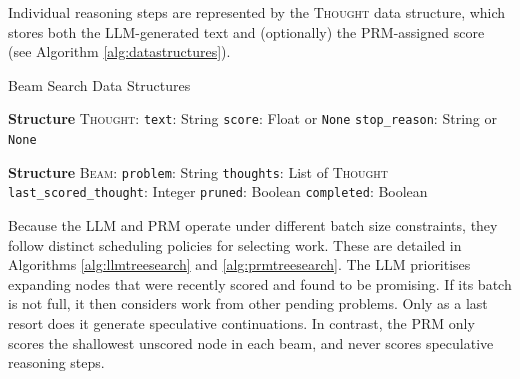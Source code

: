 \documentclass[11pt,twoside]{report}
\begin{document}
Individual reasoning steps are represented by the \textsc{Thought} data structure, which stores both the LLM-generated text and (optionally) the PRM-assigned score (see Algorithm \ref{alg:datastructures}).

\begin{algorithm}[H]\label{alg:datastructures}
\caption{Beam Search Data Structures}
\begin{algorithmic}[1]
\State \textbf{Structure} \textsc{Thought}:
\State \hspace{0.5cm} \texttt{text}: String 
\State \hspace{0.5cm} \texttt{score}: Float or \texttt{None} 
\State \hspace{0.5cm} \texttt{stop\_reason}: String or \texttt{None} 

\Statex

\State \textbf{Structure} \textsc{Beam}:
\State \hspace{0.5cm} \texttt{problem}: String 
\State \hspace{0.5cm} \texttt{thoughts}: List of \textsc{Thought} 
\State \hspace{0.5cm} \texttt{last\_scored\_thought}: Integer 
\State \hspace{0.5cm} \texttt{pruned}: Boolean 
\State \hspace{0.5cm} \texttt{completed}: Boolean 
\end{algorithmic}
\end{algorithm}

Because the LLM and PRM operate under different batch size constraints, they follow distinct scheduling policies for selecting work. 
These are detailed in Algorithms \ref{alg:llmtreesearch} and \ref{alg:prmtreesearch}. 
The LLM prioritises expanding nodes that were recently scored and found to be promising. 
If its batch is not full, it then considers work from other pending problems. 
Only as a last resort does it generate speculative continuations. 
In contrast, the PRM only scores the shallowest unscored node in each beam, and never scores speculative reasoning steps.
\end{document}
